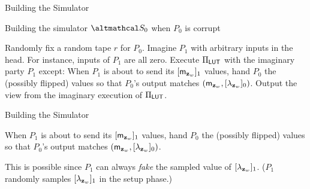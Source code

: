 \documentclass[../240906_cryptlab_flute.tex]{subfiles}
\begin{document}
\begin{frame}{Building the Simulator}
    \begin{block}{Building the simulator \(\mcal{S}_0\) when \(P_0\) is corrupt}

        \begin{enumerate}
            \ii
            Randomly fix a random tape \(r\) for \(P_0\).
            \pause
            \ii
            Imagine \(P_1\) with arbitrary inputs in the head.
            For instance, inputs of \(P_1\) are all zero.
            \ii
            Execute \(\Pi_{\mathsf{LUT}}\) with the imaginary party \(P_1\)
            except:
            \pause
            \ii
            When \(P_1\) is about to send its \([\mathsf{m}_{\mathbf{z}_w}]_1\)
            values, hand \(P_0\) the (possibly flipped) values
            so that \(P_0\)'s output matches \((\mathsf{m}_{\mathbf{z}_w}, [\lambda_{\mathbf{z}_w}]_0)\).
            \ii
            Output the view from the imaginary execution of \(\Pi_{\mathsf{LUT}}\).
        \end{enumerate}
    \end{block}
\end{frame}

\begin{frame}{Building the Simulator}
    \begin{block}{}
        When \(P_1\) is about to send its \([\mathsf{m}_{\mathbf{z}_w}]_1\)
        values, hand \(P_0\) the (possibly flipped) values
        so that \(P_0\)'s output matches \((\mathsf{m}_{\mathbf{z}_w}, [\lambda_{\mathbf{z}_w}]_0)\).
    \end{block}
    This is possible since \(P_1\) can always \emph{fake}
    the sampled value of \([\lambda_{\mathbf{z}_w}]_1\).
    (\(P_1\) randomly samples \([\lambda_{\mathbf{z}_w}]_1\) in the setup phase.)
\end{frame}
\end{document}
